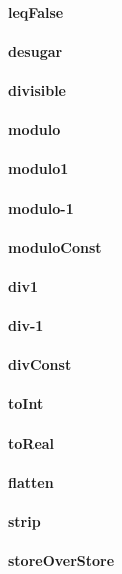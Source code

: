 \documentclass[a4paper]{article}
\begin{document}
\paragraph{leqFalse}
\paragraph{desugar}
\paragraph{divisible}
\paragraph{modulo}
\paragraph{modulo1}
\paragraph{modulo-1}
\paragraph{moduloConst}
\paragraph{div1}
\paragraph{div-1}
\paragraph{divConst}
\paragraph{toInt}
\paragraph{toReal}
\paragraph{flatten}
\paragraph{strip}
\paragraph{storeOverStore}
\end{document}
